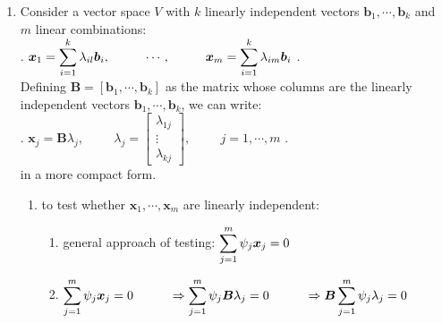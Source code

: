 \begin{enumerate}
    \item Consider a vector space $V$ with $k$ linearly independent vectors $\bm{b}_1, \cdots , \bm{b}_k$ and $m$ linear combinations:
    \hfill \cite{mfml/book/mml/Deisenroth-Faisal-Ong}
    \\
    .\hfill
    $
        \bm{x}_1
        = \displaystyle\sum_{i=1}^k \lambda_{il} \bm{b}_i,
        \hspace{1cm}
        \cdots,
        \hspace{1cm}
        \bm{x}_m = \displaystyle\sum_{i=1}^k \lambda_{im} \bm{b}_i
    $
    \hfill.
    \hfill \cite{mfml/book/mml/Deisenroth-Faisal-Ong}
    \\
    \vspace{0.2cm}
    Defining $\bm{B} = [\bm{b}_1, \cdots , \bm{b}_k]$ as the matrix whose columns are the linearly independent vectors $\bm{b}_1, \cdots , \bm{b}_k$, we can write:
    \hfill \cite{mfml/book/mml/Deisenroth-Faisal-Ong}
    \\
    .\hfill
    $
        \bm{x}_j = \bm{B}\lambda_j,
        \hspace{1cm}
        \lambda_j = \begin{bmatrix}\lambda_{1j} \\ \vdots \\ \lambda_{kj}\end{bmatrix},
        \hspace{1cm}
        j=1,\cdots,m
    $
    \hfill.
    \hfill \cite{mfml/book/mml/Deisenroth-Faisal-Ong}
    \\
    in a more compact form.
    \hfill \cite{mfml/book/mml/Deisenroth-Faisal-Ong}

    \begin{enumerate}
        \item to test whether $\bm{x}_1, \cdots , \bm{x}_m$ are linearly independent:
        \hfill \cite{mfml/book/mml/Deisenroth-Faisal-Ong}
        \begin{enumerate}
            \item general approach of testing: $\displaystyle\sum^m_{j=1} \psi_j \bm{x}_j = 0$
            \hfill \cite{mfml/book/mml/Deisenroth-Faisal-Ong}

            \item $
                    \displaystyle\sum^m_{j=1} \psi_j \bm{x}_j = 0
                    \hspace{1cm}
                    \Rightarrow \displaystyle\sum^m_{j=1} \psi_j \bm{B} \lambda_j = 0
                    \hspace{1cm}
                    \Rightarrow \bm{B} \displaystyle\sum^m_{j=1} \psi_j \lambda_j = 0
            $
            \hfill \cite{mfml/book/mml/Deisenroth-Faisal-Ong}


\end{enumerate}
\end{enumerate}
\end{enumerate}
